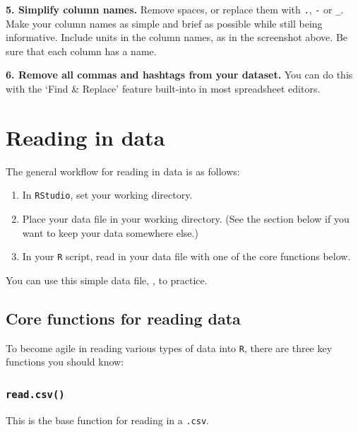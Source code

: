 \documentclass[
]{book}
\providecommand{\tightlist}{%
  \setlength{\itemsep}{0pt}\setlength{\parskip}{0pt}}
\begin{document}
\textbf{5. Simplify column names.} Remove spaces, or replace them with \texttt{.}, \texttt{-} or \texttt{\_}. Make your column names as simple and brief as possible while still being informative. Include units in the column names, as in the screenshot above. Be sure that each column has a name.

\textbf{6. Remove all commas and hashtags from your dataset.} You can do this with the `Find \& Replace' feature built-into in most spreadsheet editors.

\hypertarget{reading-in-data}{%
\section*{Reading in data}\label{reading-in-data}}

The general workflow for reading in data is as follows:

\begin{enumerate}
\def\labelenumi{\arabic{enumi}.}
\tightlist
\item
  In \texttt{RStudio}, set your working directory.
\item
  Place your data file in your working directory. (See the section below if you want to keep your data somewhere else.)
\item
  In your \texttt{R} script, read in your data file with one of the core functions below.
\end{enumerate}

You can use this simple data file, , to practice.

\hypertarget{core-functions-for-reading-data}{%
\subsection*{Core functions for reading data}\label{core-functions-for-reading-data}}

To become agile in reading various types of data into \texttt{R}, there are three key functions you should know:

\hypertarget{read.csv}{%
\subsubsection*{\texorpdfstring{\texttt{read.csv()}}{read.csv()}}\label{read.csv}}

This is the base function for reading in a \texttt{.csv}.
\end{document}
